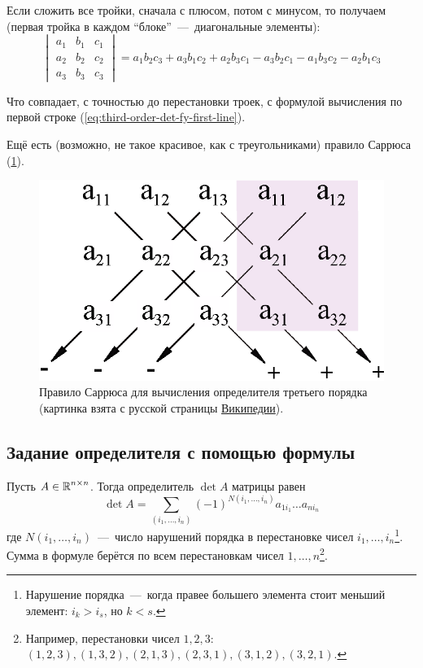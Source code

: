 \documentclass[a4paper,12pt]{article}
\begin{document}
  Если сложить все тройки, сначала с плюсом, потом с минусом, то получаем (первая тройка в каждом ``блоке''~---~диагональные элементы):
  \begin{equation*}
    \begin{vmatrix}
      a_1 & b_1 & c_1\\
      a_2 & b_2 & c_2\\
      a_3 & b_3 & c_3
    \end{vmatrix}
      = a_1 b_2 c_3 + a_3 b_1 c_2 + a_2 b_3 c_1 - a_3 b_2 c_1 - a_1 b_3 c_2 - a_2 b_1 c_3
  \end{equation*}
  
  Что совпадает, с точностью до перестановки троек, с формулой вычисления по первой строке (\ref{eq:third-order-det-fy-first-line}).
  
  Ещё есть (возможно, не такое красивое, как с треугольниками) правило Саррюса (\ref{fig:determinant-sarrus}).
  
  \begin{figure}[h]
    \centering
    
    \includegraphics[width=0.5\columnwidth]{determinant-sarrus}
    
    \caption{Правило Саррюса для вычисления определителя третьего порядка (картинка взята с русской страницы \href{https://upload.wikimedia.org/wikipedia/commons/1/17/Determinant-sarrus.svg}{Википедии}).}
    \label{fig:determinant-sarrus}
  \end{figure}
  
  
  \subsection{Задание определителя с помощью формулы}
  
  \begin{theorem}\label{theor:complete-expansion}
    Пусть $A \in \operatorname{\mathbb R}^{n \times n}$.
    Тогда определитель $\det A$ матрицы равен
    \begin{equation}
      \label{eq:complete-expansion}
      \det A = \sum_{(i_1, \ldots, i_n)} (-1)^{N(i_1, \ldots, i_n)} a_{1 i_1} \ldots a_{n i_n}
    \end{equation}
    где $N(i_1, \ldots, i_n)$~---~число нарушений порядка в перестановке чисел $i_1, \ldots, i_n$\footnote{Нарушение порядка~---~когда правее большего элемента стоит меньший элемент: $i_k > i_s$, но $k < s$.}.
    Сумма в формуле берётся по всем перестановкам чисел $1, \ldots, n$\footnote{Например, перестановки чисел $1, 2, 3$: $(1, 2, 3), (1, 3, 2), (2, 1, 3), (2, 3, 1), (3, 1, 2), (3, 2, 1)$.}.
  \end{theorem}
  
\end{document}

